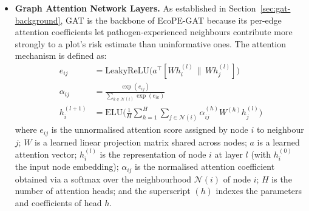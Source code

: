 \documentclass[a4paper,fleqn]{cas-sc}
\begin{document}
\begin{itemize}[leftmargin=1.4em]
The two soil-climate principal components capture the dominant axes of environmental variation, temperature--moisture gradient and seasonality, more efficiently than individual climate variables. Latitude and longitude encode geographic context without imposing a geographic connectivity structure, allowing EcoPE to learn latitudinal gradients in pathogen pressure, well documented in the epidemiological literature \citep{bebber2014}, without constraining edges to be geographically proximal. Biome identity, encoded as an integer, provides a discrete partition of the ecological space, letting EcoPE learn both fine-grained climate gradients within biomes and coarse biome-level discontinuities. A shallow 2-layer, 64-hidden-unit encoder is sufficient to learn this non-linear mapping from a 5-dimensional ecological context to the 32-dimensional output manifold, a dimension chosen to balance expressive capacity against the risk of the positional embedding dominating the 41-dimensional trait features upon concatenation. LayerNorm stabilises training given the heterogeneous scales of the input variables, and GELU is preferred over ReLU for smoother gradient flow, following common practice in Transformer-style MLP encoders.

The ecological position embedding is concatenated to the trait features, $\tilde{x}_i = [x_i \,\|\, p_i] \in \mathbb{R}^{73}$, then projected to the GAT input dimension via a learned linear layer followed by LayerNorm and GELU, as shown in the node feature enrichment step of Figure~\ref{fig:architecture}.

\item \textbf{Graph Attention Network Layers.} As established in Section~\ref{sec:gat-background}, GAT is the backbone of EcoPE-GAT because its per-edge attention coefficients let pathogen-experienced neighbours contribute more strongly to a plot's risk estimate than uninformative ones. The attention mechanism is defined as:
\begin{align}
e_{ij} &= \text{LeakyReLU}\big(a^\top [Wh_i^{(l)} \,\|\, Wh_j^{(l)}]\big) \\
\alpha_{ij} &= \frac{\exp(e_{ij})}{\sum_{k \in \mathcal{N}(i)} \exp(e_{ik})} \\
h_i^{(l+1)} &= \text{ELU}\Big(\frac{1}{H}\sum_{h=1}^{H}\sum_{j \in \mathcal{N}(i)} \alpha_{ij}^{(h)} W^{(h)} h_j^{(l)}\Big)
\end{align}
where $e_{ij}$ is the unnormalised attention score assigned by node $i$ to neighbour $j$; $W$ is a learned linear projection matrix shared across nodes; $a$ is a learned attention vector; $h_i^{(l)}$ is the representation of node $i$ at layer $l$ (with $h_i^{(0)}$ the input node embedding); $\alpha_{ij}$ is the normalised attention coefficient obtained via a softmax over the neighbourhood $\mathcal{N}(i)$ of node $i$; $H$ is the number of attention heads; and the superscript $(h)$ indexes the parameters and coefficients of head $h$.


\end{itemize}
\end{document}

